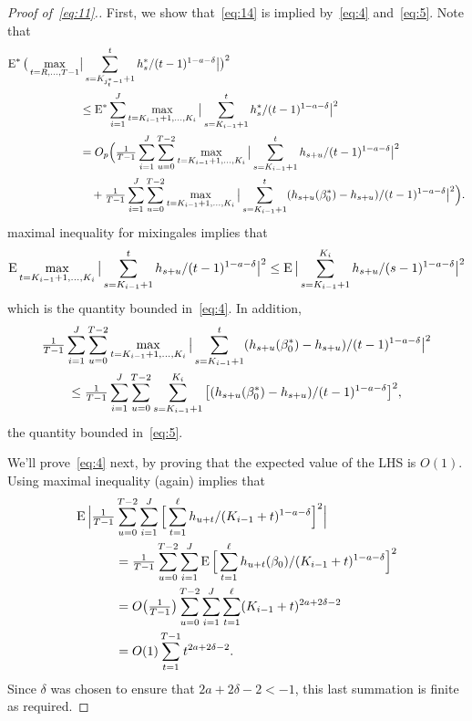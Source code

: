 \documentclass[12pt,fleqn]{article}
\begin{document}
\begin{proof}[Proof of~\eqref{eq:11}.]
First, we show that~\eqref{eq:14} is implied by~\eqref{eq:4}
and~\eqref{eq:5}. Note that
\begin{align*}
  \operatorname{E}^* \big(\max_{t=R,\dots,T-1} &\big|\sum_{s=K_{j^*_t - 1}+1}^t h_s^*/(t-1)^{1-a-\delta} \big|\big)^2 \\
  &\leq \operatorname{E}^* \sum_{i=1}^{J} \max_{t = K_{i-1}+1,\dots,K_i} \big| \sum_{s=K_{i-1}+1}^t h_s^*/(t-1)^{1-a-\delta} \big|^2 \\
  &= O_p\Big(\tfrac{1}{T-1} \sum_{i=1}^{J} \sum_{u=0}^{T-2} \max_{t = K_{i-1}+1,\dots,K_i} \big| \sum_{s=K_{i-1}+1}^t h_{s+u} /(t-1)^{1-a-\delta} \big|^2 \\
  &\quad+ \tfrac{1}{T-1} \sum_{i=1}^{J} \sum_{u=0}^{T-2} \max_{t = K_{i-1}+1,\dots,K_i} \big| \sum_{s=K_{i-1}+1}^t (h_{s+u}(\beta_0^*) - h_{s+u}) /(t-1)^{1-a-\delta} \big|^2\Big).
\end{align*}
 maximal inequality for mixingales implies that
\begin{equation*}
  \operatorname{E} \max_{t = K_{i-1}+1,\dots,K_i} \big| \sum_{s=K_{i-1}+1}^t h_{s+u} /(t-1)^{1-a-\delta} \big|^2
  \leq \operatorname{E} \big| \sum_{s=K_{i-1}+1}^{K_i} h_{s+u} /(s-1)^{1-a-\delta} \big|^2
\end{equation*}
which is the quantity bounded in~\eqref{eq:4}. In addition,
\begin{multline*}
  \tfrac{1}{T-1} \sum_{i=1}^{J} \sum_{u=0}^{T-2} \max_{t = K_{i-1}+1,\dots,K_i} \big| \sum_{s=K_{i-1}+1}^t (h_{s+u}(\beta_0^*) - h_{s+u}) /(t-1)^{1-a-\delta} \big|^2 \\
  \leq \tfrac{1}{T-1} \sum_{i=1}^{J} \sum_{u=0}^{T-2} \sum_{s=K_{i-1}+1}^{K_i} \big[(h_{s+u}(\beta_0^*) - h_{s+u})/(t-1)^{1-a-\delta}\big]^2,
\end{multline*}
the quantity bounded in~\eqref{eq:5}.

We'll prove~\eqref{eq:4} next, by proving that the expected value of
the LHS is $O(1)$. Using  maximal inequality (again)
implies that
\begin{align*}
  \operatorname{E}\Big|\tfrac{1}{T-1}
  &\sum_{u = 0}^{T-2} \sum_{i=1}^J \Big[\sum_{t = 1}^{\ell} h_{u + t}/ (K_{i-1} + t)^{1-a-\delta}\Big]^2 \Big| \\
  &= \tfrac{1}{T-1} \sum_{u = 0}^{T-2} \sum_{i=1}^J \operatorname{E} \Big[\sum_{t = 1}^{\ell} h_{u + t}(\beta_0)/ (K_{i-1} + t)^{1-a-\delta} \Big]^2 \\
  &= O\big(\tfrac{1}{T-1}\big) \sum_{u = 0}^{T-2} \sum_{i=1}^J \sum_{t = 1}^{\ell} (K_{i-1} + t)^{2a + 2\delta-2} \\
  &= O(1) \sum_{t=1}^{T-1} t^{2a+2\delta-2}.
\end{align*}
Since $\delta$ was chosen to ensure that $2a+2\delta-2 < -1$, this
last summation is finite as required.


\end{proof}
\end{document}
